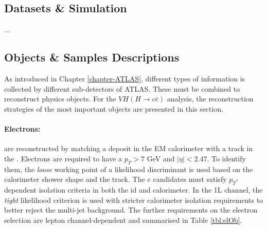 \subsection{Datasets \& Simulation}\label{sec-datasets}
...

\subsection{Objects \& Samples Descriptions}\label{sec-obj}
As introduced in Chapter \ref{chapter-ATLAS}, different types of information is collected by different sub-detectors of ATLAS. These must be combined to reconstruct physics objects. For the $VH (H\rightarrow c\bar{c})$ analysis, the reconstruction strategies of the most important objects are presented in this section. 

\paragraph{Electrons:} are reconstructed by matching a deposit in the EM calorimeter with a track in the  \cite{Aaboud:2657964, Aad_2019}. Electrons are required to have a $p_T > 7$ GeV and $|\eta|<2.47$. To identify them, the \textit{loose} working point of a likelihood discriminant is used based on the calorimeter shower shape and the track. The $e$ candidates must satisfy $p_T$-dependent isolation criteria in both the \gls{id} and calorimeter. In the 1L channel, the \textit{tight} likelihood criterion is used with stricter calorimeter isolation requirements to better reject the multi-jet background. The further requirements on the electron selection are lepton channel-dependent and summarised in Table \ref{tbl:elOb}. %

\begin{table}[!htbp]
  \begin{center}
    \caption{Electron Selection requirements.}
    \label{tbl:elOb}
  \end{center}
\end{table}

